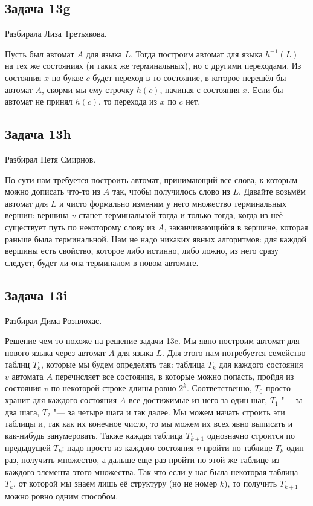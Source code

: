\subsection{Задача 13g}
	Разбирала Лиза Третьякова.
	
	Пусть был автомат $A$ для языка $L$.
	Тогда построим автомат для языка $h^{-1}(L)$ на тех же состояниях (и таких же терминальных), но с другими переходами.
	Из состояния $x$ по букве $c$ будет переход в то состояние, в которое перешёл бы автомат $A$, скорми
	мы ему строчку $h(c)$, начиная с состояния $x$.
	Если бы автомат не принял $h(c)$, то перехода из $x$ по $c$ нет.

\subsection{Задача 13h}
	Разбирал Петя Смирнов.

	По сути нам требуется построить автомат, принимающий все слова, к которым можно дописать что-то из $A$ так, чтобы
	получилось слово из $L$.
	Давайте возьмём автомат для $L$ и чисто формально изменим у него множество терминальных вершин:
	вершина $v$ станет терминальной тогда и только тогда, когда из неё существует путь по некоторому слову из $A$,
	заканчивающийся в вершине, которая раньше была терминальной.
	Нам не надо никаких явных алгоритмов: для каждой вершины есть свойство, которое либо истинно, либо ложно, из него сразу
	следует, будет ли она терминалом в новом автомате.

\subsection{Задача 13i}
	Разбирал Дима Розплохас.

	Решение чем-то похоже на решение задачи \hyperref[prob13e]{13e}.
	Мы явно построим автомат для нового языка через автомат $A$ для языка $L$.
	Для этого нам потребуется семейство таблиц $T_k$, которые мы будем определять так:
	таблица $T_k$ для каждого состояния $v$ автомата $A$ перечисляет все состояния,
	в которые можно попасть, пройдя из состояния $v$ по некоторой строке длины ровно $2^k$.
	Соответственно, $T_0$ просто хранит для каждого состояния $A$ все достижимые из него за один шаг,
	$T_1$ "--- за два шага, $T_2$ "--- за четыре шага и так далее.
	Мы можем начать строить эти таблицы и, так как их конечное число, то мы можем их всех явно выписать и как-нибудь
	занумеровать.
	Также каждая таблица $T_{k+1}$ однозначно строится по предыдущей $T_k$: надо просто из каждого состояния
	$v$ пройти по таблице $T_k$ один раз, получить множество, а дальше еще раз пройти по этой же таблице из каждого элемента этого множества.
	Так что если у нас была некоторая таблица $T_k$, от которой мы знаем лишь её структуру (но не номер $k$), то получить $T_{k+1}$ можно ровно одним способом.

